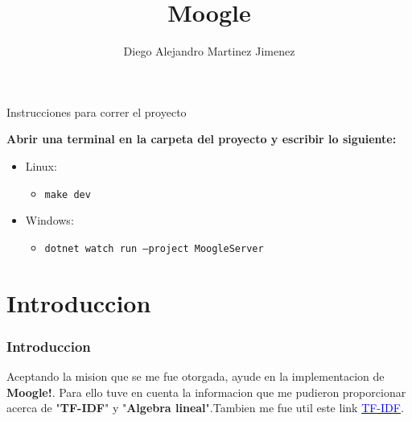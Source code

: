 \documentclass[11pt]{beamer}
\author{Diego Alejandro Martinez Jimenez}
\title{Moogle}
\begin{document}
\begin{frame}
\titlepage
\end{frame}

\renewcommand{\thesection}{\arabic{section}}

\begin{frame}{Instrucciones para correr el proyecto}

    \textbf{Abrir una terminal en la carpeta del proyecto y escribir lo siguiente:}
    
    \begin{itemize}
        \item Linux:
              \begin{itemize} \item \texttt{make dev} \end{itemize}
        \item Windows:
              \begin{itemize} \item \texttt{dotnet watch run --project MoogleServer}\end{itemize}
    \end{itemize}

\end{frame}

\section*{Introduccion}

\begin{frame}
    
    \frametitle{Introduccion}
    
    Aceptando la mision que se me fue otorgada, ayude en la implementacion de \textbf{Moogle!}. Para ello tuve en cuenta la informacion que me pudieron proporcionar acerca de "\textbf{TF-IDF}" y "\textbf{Algebra lineal}".Tambien me fue util este link \hyperlink{https://en.wikipedia.org/wiki/Tf\%E2\%80\%93idf}{\textcolor{blue}{TF-IDF}}.
    
    
\end{frame}
\end{document}
